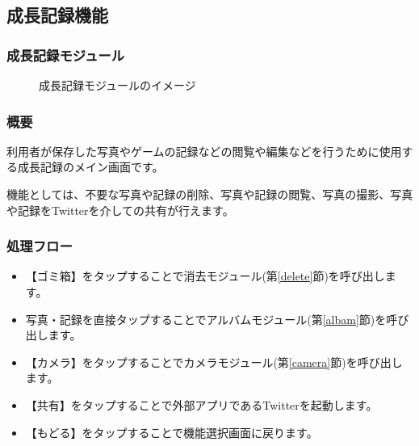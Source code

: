 \documentclass[a4j]{jarticle}
\begin{document}
\subsection{成長記録機能}
\subsubsection{成長記録モジュール\label{grow}}
\begin{figure}[H]
    \begin{center}
    \caption {成長記録モジュールのイメージ}
    \label{functionselection}
    \end{center}
\end{figure}


\subsubsection*{概要}
利用者が保存した写真やゲームの記録などの閲覧や編集などを行うために使用する成長記録のメイン画面です。

機能としては、不要な写真や記録の削除、写真や記録の閲覧、写真の撮影、写真や記録をTwitterを介しての共有が行えます。

\subsubsection*{処理フロー}
\begin{itemize}
\item 【ゴミ箱】をタップすることで消去モジュール(第\ref{delete}節)を呼び出します。

\item 写真・記録を直接タップすることでアルバムモジュール(第\ref{albam}節)を呼び出します。

\item 【カメラ】をタップすることでカメラモジュール(第\ref{camera}節)を呼び出します。

\item 【共有】をタップすることで外部アプリであるTwitterを起動します。

\item 【もどる】をタップすることで機能選択画面に戻ります。
\end{itemize}
\end{document}
